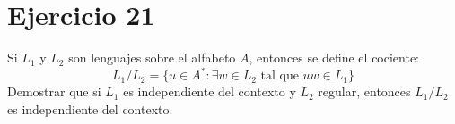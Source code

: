 \documentclass[11pt,a4paper]{article}
\begin{document}
\section*{Ejercicio 21}
Si $L_1$ y $L_2$ son lenguajes sobre el alfabeto $A$, entonces se define el cociente: $$L_1/L_2 = \{u \in A^* : \exists w \in L_2 \text { tal que } uw \in L_1 \}$$ Demostrar que si $L_1$ es independiente del contexto y $L_2$ regular, entonces $L_1/L_2$ es independiente del contexto. \\
\end{document}
